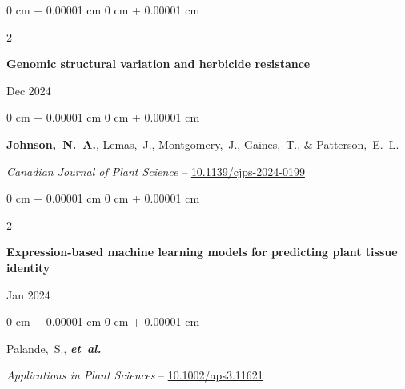\documentclass[10pt, letterpaper]{article}
\newenvironment{onecolentry}{
    \begin{adjustwidth}{
        0 cm + 0.00001 cm
    }{
        0 cm + 0.00001 cm
    }
}{
    \end{adjustwidth}
} %
\newenvironment{twocolentry}[2][]{
    \onecolentry
    \def\secondColumn{#2}
    \setcolumnwidth{\fill, 4.5 cm}
    \begin{paracol}{2}
}{
    \switchcolumn \raggedleft \secondColumn
    \end{paracol}
    \endonecolentry
} %
\begin{document}
        \begin{samepage}
            \begin{twocolentry}{
                Dec 2024
                }
                \textbf{Genomic structural variation and herbicide resistance}
            \end{twocolentry}

            \vspace{0.10 cm}
            
            \begin{onecolentry}
                \mbox{\textbf{Johnson, N. A.}}, \mbox{Lemas, J.}, \mbox{Montgomery, J.}, \mbox{Gaines, T.}, \& \mbox{Patterson, E. L.}

                \vspace{0.10 cm}
                
                \textit{Canadian Journal of Plant Science} -- \href{https://doi.org/10.1139/cjps-2024-0199}{10.1139/cjps-2024-0199}
            \end{onecolentry}
        \end{samepage}


        \vspace{0.2 cm}

        
        \begin{samepage}
            \begin{twocolentry}{
                Jan 2024
                }
                \textbf{Expression-based machine learning models for predicting plant tissue identity}
            \end{twocolentry}

            \vspace{0.10 cm}
            
            \begin{onecolentry}
                \mbox{Palande, S.}, \mbox{\textbf{\textit{et al.}}}

                \vspace{0.10 cm}
                
                \textit{Applications in Plant Sciences} -- \href{https://doi.org/10.1002/aps3.11621}{10.1002/aps3.11621}
            \end{onecolentry}
        \end{samepage}


        \vspace{0.2 cm}
        
\end{document}
